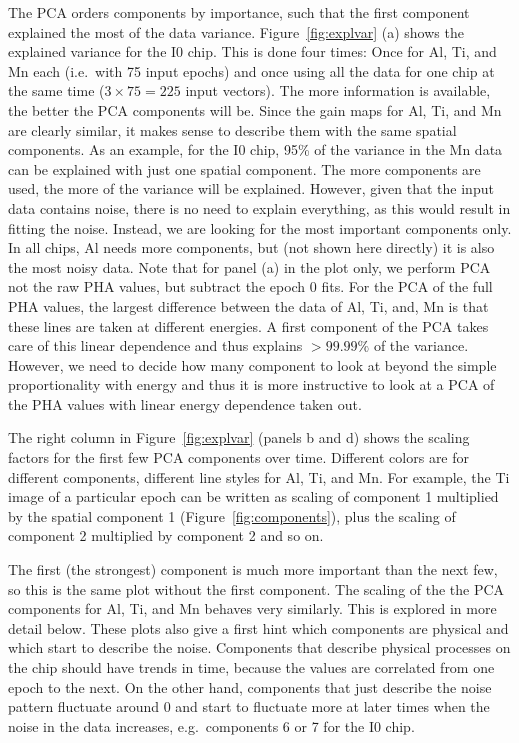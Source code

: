 \documentclass[]{spie}  %
\begin{document}
The PCA orders components by importance, such that the first component explained the most of the data variance.  Figure~\ref{fig:explvar} (a) shows the explained variance for the I0 chip.
This is done four times: Once for Al, Ti, and Mn each (i.e.\ with 75 input epochs) and once using all the data for one chip at the same time ($3\times75=225$ input vectors). The more information is available, the better the PCA components will be. Since the gain maps for Al, Ti, and Mn are clearly similar, it makes sense to describe them with the same spatial components. As an example, for the I0 chip, 95\% of the variance in the Mn data can be explained with just one spatial component. The more components are used, the more of the variance will be explained. However, given that the input data contains noise, there is no need to explain everything, as this would result in fitting the noise. Instead, we are looking for the most important components only. In all chips, Al needs more components, but (not shown here directly) it is also the most noisy data. Note that for panel (a) in the plot only, we perform PCA not the raw PHA values, but subtract the epoch 0 fits. For the PCA of the full PHA values, the largest difference between the data of Al, Ti, and, Mn is that these lines are taken at different energies. A first component of the PCA takes care of this linear dependence and thus explains $>99.99\%$ of the variance. However, we need to decide how many component to look at beyond the simple proportionality with energy and thus it is more instructive to look at a PCA of the PHA values with linear energy dependence taken out.

The right column in Figure~\ref{fig:explvar} (panels b and d) shows the scaling factors for the first few PCA components over time. Different colors are for different components, different line styles for Al, Ti, and Mn. For example, the Ti image of a particular epoch can be written as scaling of component 1 multiplied by the spatial component 1 (Figure~\ref{fig:components}), plus the scaling of component 2 multiplied by component 2 and so on.

The first (the strongest) component is much more important than the next few, so this is the same plot without the first component. The scaling of the the PCA components for Al, Ti, and Mn behaves very similarly. This is explored in more detail below. These plots also give a first hint which components are physical and which start to describe the noise. Components that describe physical processes on the chip should have trends in time, because the values are correlated from one epoch to the next. On the other hand, components that just describe the noise pattern fluctuate around 0 and start to fluctuate more at later times when the noise in the data increases, e.g.\ components 6 or 7 for the I0 chip.
\end{document}
